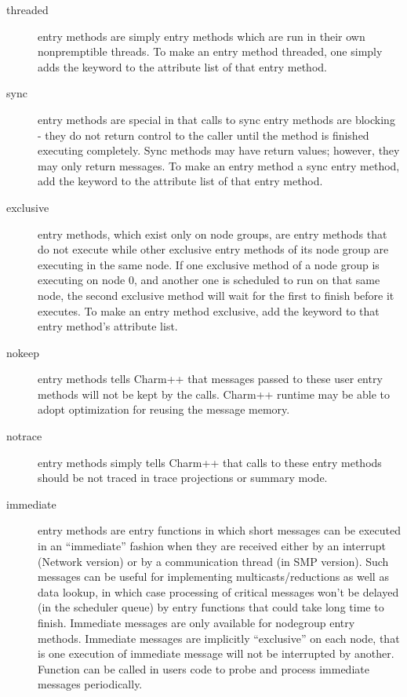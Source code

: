 \begin{description}
\item[threaded] entry methods are simply entry
methods which are run in their own nonpremptible threads.  To make an
entry method threaded, one simply adds the keyword
 to the attribute list of that entry method.

\item[sync] entry methods are special in that calls to
sync entry methods are blocking - they do not return control to the caller
until the method is finished executing completely.  Sync methods may have
return values; however, they may only return messages.  To make an entry method a sync entry method, add the keyword  to the
attribute list of that entry method.

\item[exclusive] entry methods, which exist only on node groups, are
entry methods that do not execute while other exclusive
entry methods of its node group are executing in the same
node.  If one exclusive method of a node group is executing on node 0, and
another one is scheduled to run on that same node, the second exclusive method
will wait for the first to finish before it executes.  To make an entry method exclusive, add the keyword  to that
entry method's attribute list.

\item[nokeep] entry methods tells Charm++ that messages passed to
these user entry methods will not be kept by the calls. Charm++ runtime
may be able to adopt optimization for reusing the message memory.

\item[notrace] entry methods simply tells Charm++ that calls to 
these entry methods should be not traced in trace projections or summary mode.

\item[immediate] entry methods are entry functions in which 
short messages can be executed in an ``immediate'' fashion when they are
received either by an interrupt (Network version) or by a communication thread
(in SMP version). Such messages can be useful for implementing
multicasts/reductions as well as data lookup, in which case processing of
critical messages won't be delayed (in the scheduler queue) by entry functions
that could take long time to finish. Immediate messages are only available for
nodegroup entry methods. Immediate messages are implicitly ``exclusive'' on each
node, that is one execution of immediate message will not be interrupted by
another. Function  can be called in users code to
probe and process immediate messages periodically.


\end{description}
